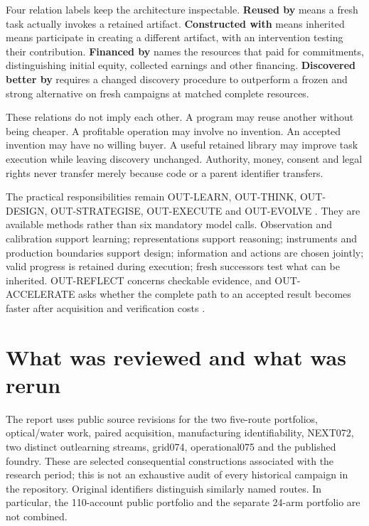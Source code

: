 \documentclass[11pt,letterpaper]{article}
\begin{document}
Four relation labels keep the architecture inspectable. \textbf{Reused by} means a fresh task actually invokes a retained artifact. \textbf{Constructed with} means inherited means participate in creating a different artifact, with an intervention testing their contribution. \textbf{Financed by} names the resources that paid for commitments, distinguishing initial equity, collected earnings and other financing. \textbf{Discovered better by} requires a changed discovery procedure to outperform a frozen and strong alternative on fresh campaigns at matched complete resources.

These relations do not imply each other. A program may reuse another without being cheaper. A profitable operation may involve no invention. An accepted invention may have no willing buyer. A useful retained library may improve task execution while leaving discovery unchanged. Authority, money, consent and legal rights never transfer merely because code or a parent identifier transfers.

The practical responsibilities remain OUT-LEARN, OUT-THINK, OUT-DESIGN, OUT-STRATEGISE, OUT-EXECUTE and OUT-EVOLVE \cite{outlearn,outthink,outdesign,outstrategise,outexecute,outevolve}. They are available methods rather than six mandatory model calls. Observation and calibration support learning; representations support reasoning; instruments and production boundaries support design; information and actions are chosen jointly; valid progress is retained during execution; fresh successors test what can be inherited. OUT-REFLECT concerns checkable evidence, and OUT-ACCELERATE asks whether the complete path to an accepted result becomes faster after acquisition and verification costs \cite{outreflect,outaccelerate}.

\FloatBarrier
\section{What was reviewed and what was rerun}
The report uses public source revisions for the two five-route portfolios, optical/water work, paired acquisition, manufacturing identifiability, NEXT072, two distinct outlearning streams, grid074, operational075 and the published foundry. These are selected consequential constructions associated with the research period; this is not an exhaustive audit of every historical campaign in the repository. Original identifiers distinguish similarly named routes. In particular, the 110-account public portfolio and the separate 24-arm portfolio are not combined.
\end{document}
